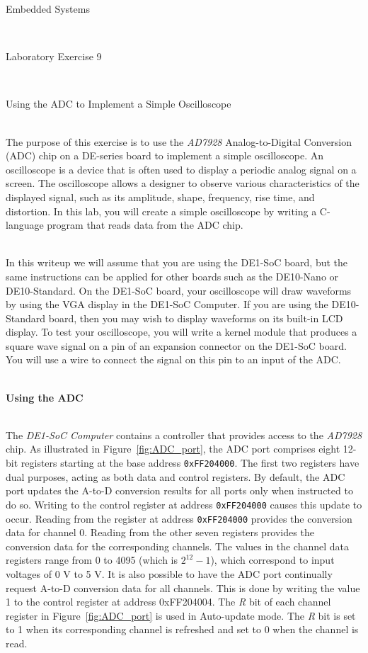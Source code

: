\documentclass[epsfig,10pt,fullpage]{article}
\newcommand{\LabNum}{9}
\begin{document}
\centerline{\huge Embedded Systems}
~\\
\centerline{\huge Laboratory Exercise \LabNum}
~\\
\centerline{\large Using the ADC to Implement a Simple Oscilloscope}
~\\

\noindent
The purpose of this exercise is to use the \textit{AD7928} Analog-to-Digital Conversion (ADC)
chip on a DE-series board to implement a simple oscilloscope. An oscilloscope is a device that
is often used to display a periodic analog signal on a screen. The oscilloscope allows a 
designer to observe various characteristics of the displayed signal, such as its amplitude, 
shape, frequency, rise time, and distortion. In this lab, you will create
a simple oscilloscope by writing a C-language program that reads data from the ADC chip. 

~\\
\noindent
In this writeup we will assume that you are using the DE1-SoC board, but the same
instructions can be applied for other boards such as the DE10-Nano or DE10-Standard.
On the DE1-SoC board, your oscilloscope will draw waveforms by using the VGA display in 
the DE1-SoC Computer. If you are using the DE10-Standard board, then you may wish to
display waveforms on its built-in LCD display. To test your oscilloscope, you will write a 
kernel module that produces a square wave signal on a pin of an expansion connector on the 
DE1-SoC board. You will use a wire to connect the signal on this pin to an input of the ADC.

~\\
\noindent
{\bf Using the ADC}

~\\
\noindent
The \textit{DE1-SoC Computer} contains a controller that provides access to 
the \textit{AD7928} chip.  As illustrated in
Figure~\ref{fig:ADC_port}, the ADC port comprises eight 12-bit registers starting at the
base address \texttt{0xFF204000}. The first two registers have dual purposes, acting as both
data and control registers.  By default, the ADC port updates the A-to-D conversion
results for all ports only when instructed to do so. Writing to the control register at 
address \texttt{0xFF204000} causes this update to occur. Reading from the register at address
\texttt{0xFF204000} provides the conversion data for channel 0. Reading from the other seven
registers provides the conversion data for the corresponding channels. The values in the 
channel data registers range from 0 to 4095 (which is $2^{12} - 1$), which correspond to input
voltages of 0 V to 5 V.
It is also possible to have the ADC port continually request A-to-D conversion data for 
all channels. This is done by writing the value 1 to the control register at address 
{\sf 0xFF204004}. The {\it R} bit of each channel register in Figure~\ref{fig:ADC_port} is 
used in Auto-update mode. The {\it R} bit is set to 1 when its corresponding channel is 
refreshed and set to 0 when the channel is read. 
\end{document}
